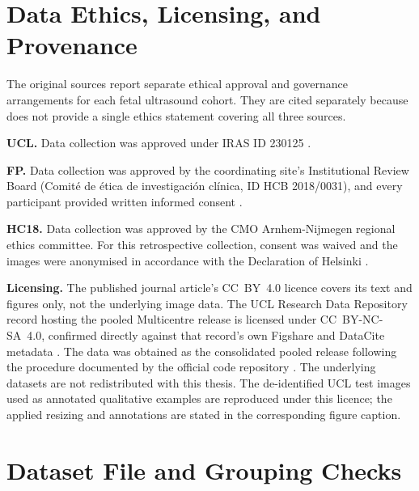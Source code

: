
\section{Data Ethics, Licensing, and Provenance}
\label{app:ethics}

The original sources report separate ethical approval and governance
arrangements for each fetal ultrasound cohort. They are cited
separately because \textcite{divece2025multicentre} does not provide
a single ethics statement covering all three sources.

\textbf{UCL.} Data collection was approved under IRAS ID 230125
\parencite{divece2025multicentre}.

\textbf{FP.} Data collection was approved by the coordinating site's
Institutional Review Board (Comit\'e de {\'e}tica de investigaci{\'o}n
cl\'inica, ID HCB 2018/0031), and every participant provided written
informed consent \parencite{burgosartizzu2020fetalplanes}.

\textbf{HC18.} Data collection was approved by the CMO
Arnhem-Nijmegen regional ethics committee. For this retrospective
collection, consent was waived and the images were anonymised in
accordance with the Declaration of Helsinki
\parencite{vandenheuvel2018hc18}.

\textbf{Licensing.} The published journal article's CC~BY~4.0
licence covers its text and figures only, not the underlying image
data. The UCL Research Data Repository record hosting the pooled
Multicentre release is licensed under CC~BY-NC-SA~4.0, confirmed
directly against that record's own Figshare and DataCite metadata
\parencite{divece2025rdr}. The data was obtained as the consolidated
pooled release following the procedure documented by the official
code repository \parencite{multicentrefetalbiometryrepo}. The
underlying datasets are not redistributed with this thesis. The
de-identified UCL test images used as annotated qualitative examples
are reproduced under this licence; the applied resizing and
annotations are stated in the corresponding figure caption.



\section{Dataset File and Grouping Checks}
\label{app:multicentre-audit}

